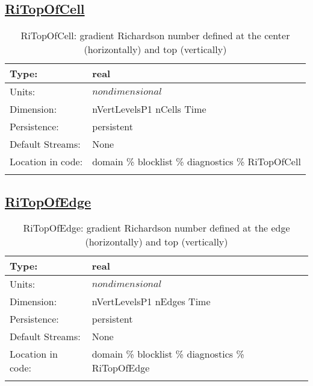 \subsection[RiTopOfCell]{\hyperref[sec:var_tab_diagnostics]{RiTopOfCell}}
\label{subsec:var_sec_diagnostics_RiTopOfCell}
\begin{center}
\begin{longtable}{| p{2.0in} | p{4.0in} |}
        \hline 
        Type: & real \\
        \hline 
        Units: & $nondimensional$ \\
        \hline 
        Dimension: & nVertLevelsP1 nCells Time \\
        \hline 
        Persistence: & persistent \\
        \hline 
		 Default Streams: & None \\
        \hline 
		 Location in code: & domain \% blocklist \% diagnostics \% RiTopOfCell \\
		 \hline 
    \caption{RiTopOfCell: gradient Richardson number defined at the center (horizontally) and top (vertically)}
\end{longtable}
\end{center}
\subsection[RiTopOfEdge]{\hyperref[sec:var_tab_diagnostics]{RiTopOfEdge}}
\label{subsec:var_sec_diagnostics_RiTopOfEdge}
\begin{center}
\begin{longtable}{| p{2.0in} | p{4.0in} |}
        \hline 
        Type: & real \\
        \hline 
        Units: & $nondimensional$ \\
        \hline 
        Dimension: & nVertLevelsP1 nEdges Time \\
        \hline 
        Persistence: & persistent \\
        \hline 
		 Default Streams: & None \\
        \hline 
		 Location in code: & domain \% blocklist \% diagnostics \% RiTopOfEdge \\
		 \hline 
    \caption{RiTopOfEdge: gradient Richardson number defined at the edge (horizontally) and top (vertically)}
\end{longtable}
\end{center}
